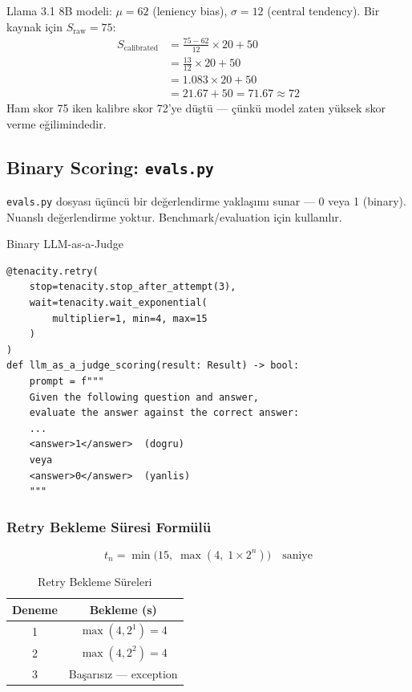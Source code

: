 \begin{ornek}
Llama 3.1 8B modeli: $\mu = 62$ (leniency bias), $\sigma = 12$ (central tendency). Bir kaynak i\c{c}in $S_{\text{raw}} = 75$:
\begin{align}
S_{\text{calibrated}} &= \frac{75 - 62}{12} \times 20 + 50 \nonumber \\
                       &= \frac{13}{12} \times 20 + 50 \nonumber \\
                       &= 1.083 \times 20 + 50 \nonumber \\
                       &= 21.67 + 50 = 71.67 \approx 72
\end{align}
Ham skor 75 iken kalibre skor 72'ye d\"{u}\c{s}t\"{u} --- \c{c}\"{u}nk\"{u} model zaten y\"{u}ksek skor verme e\u{g}ilimindedir.
\end{ornek}

\subsection{Binary Scoring: \texttt{evals.py}}

\texttt{evals.py} dosyas{\i} \"{u}\c{c}\"{u}nc\"{u} bir de\u{g}erlendirme yakla\c{s}{\i}m{\i} sunar --- 0 veya 1 (binary). Nuansl{\i} de\u{g}erlendirme yoktur. Benchmark/evaluation i\c{c}in kullan{\i}l{\i}r.

\begin{kodref}{Binary LLM-as-a-Judge}
\begin{lstlisting}
@tenacity.retry(
    stop=tenacity.stop_after_attempt(3),
    wait=tenacity.wait_exponential(
        multiplier=1, min=4, max=15
    )
)
def llm_as_a_judge_scoring(result: Result) -> bool:
    prompt = f"""
    Given the following question and answer,
    evaluate the answer against the correct answer:
    ...
    <answer>1</answer>  (dogru)
    veya
    <answer>0</answer>  (yanlis)
    """
\end{lstlisting}
\end{kodref}

\subsubsection{Retry Bekleme S\"{u}resi Form\"{u}l\"{u}}

\begin{equation}
\label{eq:retry-wait}
t_n = \min\bigl(15,\; \max(4,\; 1 \times 2^n)\bigr) \quad \text{saniye}
\end{equation}

\begin{table}[H]
\centering
\caption{Retry Bekleme S\"{u}releri}
\label{tab:retry-waits}
\begin{tabular}{cc}
\toprule
\color{chapterBlue}\textbf{Deneme} & \color{chapterBlue}\textbf{Bekleme (s)} \\
\midrule
1 & $\max(4, 2^1) = 4$ \\
2 & $\max(4, 2^2) = 4$ \\
3 & Ba\c{s}ar{\i}s{\i}z --- exception \\
\bottomrule
\end{tabular}
\end{table}

